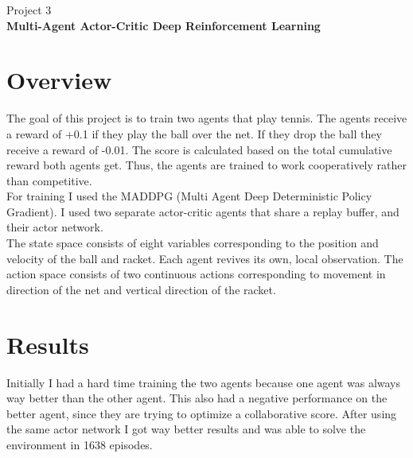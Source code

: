 \documentclass[12pt,a4paper]{article}
\begin{document}
    \begin{center}
        Project 3
        \\
        \vspace{0.5cm}
        \textbf{\Large Multi-Agent Actor-Critic Deep Reinforcement Learning}
    \end{center}


    \section{Overview}\label{sec:overview}
    The goal of this project is to train two agents that play tennis.
    The agents receive a reward of +0.1 if they play the ball over the net.
    If they drop the ball they receive a reward of -0.01.
    The score is calculated based on the total cumulative reward both agents get.
    Thus, the agents are trained to work cooperatively rather than competitive.
    \\
    For training I used the MADDPG (Multi Agent Deep Deterministic Policy Gradient).
    I used two separate actor-critic agents that share a replay buffer, and their actor network.
    \\
    The state space consists of eight variables corresponding to the position and velocity of the ball and racket.
    Each agent revives its own, local observation.
    The action space consists of two continuous actions corresponding to movement in direction of the net and vertical direction of the racket.


    \section{Results}\label{sec:results}
    Initially I had a hard time training the two agents because one agent was always way better than the other agent.
    This also had a negative performance on the better agent, since they are trying to optimize a collaborative score.
    After using the same actor network I got way better results and was able to solve the environment in 1638 episodes.
\end{document}
